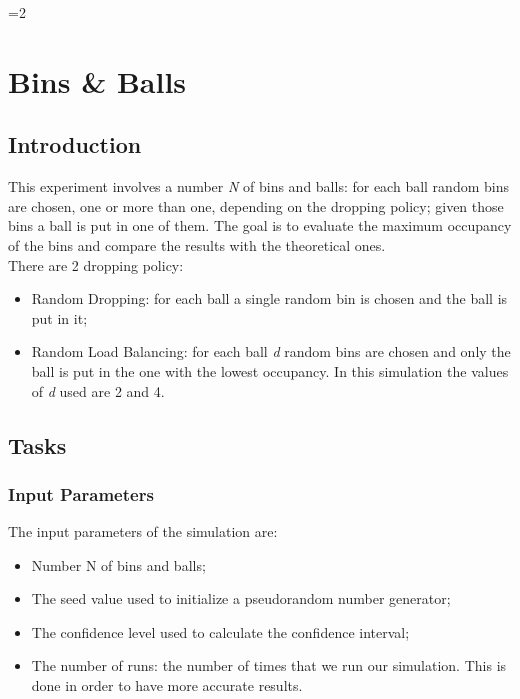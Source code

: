 \documentclass[twocolumn,letterpaper]{report}
\newcounter{debug}
\begin{document}
\ifnum\value{debug}=2 {
    
\chapter{Bins \& Balls}
	 
	\section{Introduction}
	 
	This experiment involves a number \emph{N} of bins and balls: for each ball random bins are chosen, one or more than one, depending on the dropping policy; given those bins a ball is put in one of them.	The goal is to evaluate the maximum occupancy of the bins and compare the results with the theoretical ones. \\
	 There are 2 dropping policy:
	\begin{itemize}
		\item Random Dropping: for each ball a single random bin is chosen and the ball is put in it; 
		\item Random Load Balancing: for each ball \emph{d} random bins are chosen and only the ball is put in the one with the lowest occupancy. In this simulation the values of \emph{d} used are 2 and 4.
	\end{itemize}

	\section{Tasks}
	 
		\subsection{Input Parameters}
			The input parameters of the simulation are:
			\begin{itemize}
				\item Number N of bins and balls;
				\item The seed value used to initialize a pseudorandom number generator;
				\item The confidence level used to calculate the confidence interval;
				\item The number of runs: the number of times that we run our simulation. This is done in order to have more accurate results.
			\end{itemize}
			 
}
\end{document}
